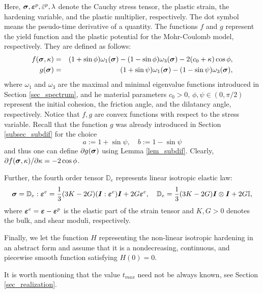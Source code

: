 \documentclass[a4paper,12pt]{article}
\theoremstyle{remark}
\newcommand{\mbf}[1]{\mbox{\boldmath$#1$}}
\numberwithin{equation}{section}
\begin{document}
\medskip\noindent
Here, $\mbf\sigma,\mbf{\varepsilon}^p, \bar\varepsilon^p,\lambda$ denote the Cauchy stress tensor, the plastic strain, the hardening variable, and the plastic multiplier, respectively. The dot symbol means the pseudo-time derivative of a quantity. The functions $f$ and $g$ represent the yield function and the plastic potential for the Mohr-Coulomb model, respectively. They are defined as follows:
\begin{eqnarray}
f(\mbf\sigma,\kappa)&=&(1+\sin\phi)\omega_1(\mbf\sigma)-(1-\sin\phi)\omega_3(\mbf\sigma)-2(c_0+\kappa)\cos\phi,\label{yield_function_simpl}\\
g(\mbf\sigma)&=&(1+\sin\psi)\omega_1(\mbf\sigma)-(1-\sin\psi)\omega_3(\mbf\sigma),
\label{potential_function}
\end{eqnarray}
where $\omega_1$ and $\omega_3$ are the maximal and minimal eigenvalue functions introduced in Section \ref{sec_spectrum}, and
he material parameters $c_0>0$, $\phi,\psi\in(0,\pi/2)$ represent the initial cohesion, the friction angle, and the dilatancy angle, respectively. Notice that $f,g$ are convex functions with respect to the stress variable. Recall that the function $g$ was already introduced in Section \ref{subsec_subdif} for the choice
\begin{equation}
a:=1+\sin\psi,\quad b:=1-\sin\psi
\label{def_ab}
\end{equation}
and thus one can define $\partial g(\mbf\sigma)$ using Lemma \ref{lem_subdif}.
Clearly, $\partial f(\mbf\sigma,\kappa)/\partial \kappa=-2\cos\phi$.

Further, the fourth order tensor $\mathbb D_e$ represents linear isotropic elastic law:
\begin{equation}
\mbf\sigma=\mathbb D_e:\mbf{\varepsilon}^e=\frac{1}{3}(3K-2G)(\mbf I:\mbf{\varepsilon}^e)\mbf I+2G\mbf{\varepsilon}^e,\quad \mathbb D_e=\frac{1}{3}(3K-2G)\mbf I\otimes\mbf I+2G\mathbb I,
\label{elastic_law}
\end{equation}
where $\mbf\varepsilon^e=\mbf\varepsilon-\mbf\varepsilon^p$ is the elastic part of the strain tensor and $K,G>0$ denotes the bulk, and shear moduli, respectively. 

Finally, we let the function $H$ representing the non-linear isotropic hardening in an abstract form and assume that
it is a nondecreasing, continuous, and piecewise smooth function satisfying $H(0)=0$. 

It is worth mentioning that the value $t_{max}$ need not be always known, see Section \ref{sec_realization}.
\end{document}
